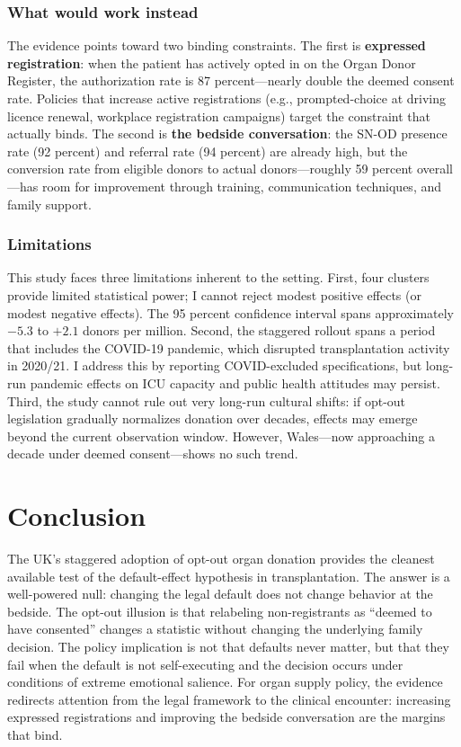 \documentclass[12pt]{article}
\begin{document}
\subsubsection*{What would work instead} The evidence points toward two binding constraints. The first is \textbf{expressed registration}: when the patient has actively opted in on the Organ Donor Register, the authorization rate is 87 percent---nearly double the deemed consent rate. Policies that increase active registrations (e.g., prompted-choice at driving licence renewal, workplace registration campaigns) target the constraint that actually binds. The second is \textbf{the bedside conversation}: the SN-OD presence rate (92 percent) and referral rate (94 percent) are already high, but the conversion rate from eligible donors to actual donors---roughly 59 percent overall---has room for improvement through training, communication techniques, and family support.

\subsubsection*{Limitations} This study faces three limitations inherent to the setting. First, four clusters provide limited statistical power; I cannot reject modest positive effects (or modest negative effects). The 95 percent confidence interval spans approximately $-5.3$ to $+2.1$ donors per million. Second, the staggered rollout spans a period that includes the COVID-19 pandemic, which disrupted transplantation activity in 2020/21. I address this by reporting COVID-excluded specifications, but long-run pandemic effects on ICU capacity and public health attitudes may persist. Third, the study cannot rule out very long-run cultural shifts: if opt-out legislation gradually normalizes donation over decades, effects may emerge beyond the current observation window. However, Wales---now approaching a decade under deemed consent---shows no such trend.

\section{Conclusion}

The UK's staggered adoption of opt-out organ donation provides the cleanest available test of the default-effect hypothesis in transplantation. The answer is a well-powered null: changing the legal default does not change behavior at the bedside. The opt-out illusion is that relabeling non-registrants as ``deemed to have consented'' changes a statistic without changing the underlying family decision. The policy implication is not that defaults never matter, but that they fail when the default is not self-executing and the decision occurs under conditions of extreme emotional salience. For organ supply policy, the evidence redirects attention from the legal framework to the clinical encounter: increasing expressed registrations and improving the bedside conversation are the margins that bind.
\end{document}
